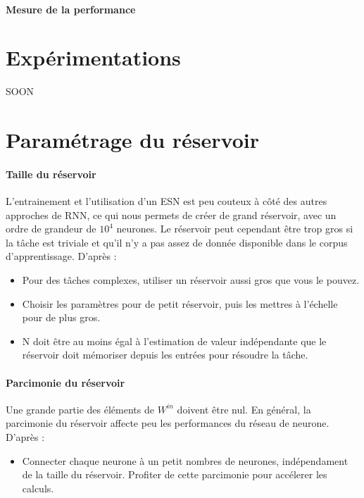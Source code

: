 \documentclass[12pt]{article}
\begin{document}
\paragraph{Mesure de la performance}

\section{Expérimentations}

\begin{center}
SOON
\end{center}


\appendix

\section{Paramétrage du réservoir}

\paragraph{Taille du réservoir}
L'entrainement et l'utilisation d'un ESN est peu couteux à côté des autres approches de RNN, ce qui nous permets de créer de grand réservoir, avec un ordre de grandeur de $10^{4}$ neurones. Le réservoir peut cependant être trop gros si la tâche est triviale et qu'il n'y a pas assez de donnée disponible dans le corpus d'apprentissage.\newline
D'après \cite{Lukosevicius12}:
\begin{itemize}
\item Pour des tâches complexes, utiliser un réservoir aussi gros que vous le pouvez.
\item Choisir les paramètres pour de petit réservoir, puis les mettres à l'échelle pour de plus gros.
\item N doit être au moins égal à l'estimation de valeur indépendante que le réservoir doit mémoriser depuis les entrées pour résoudre la tâche.
\end{itemize}

\paragraph{Parcimonie du réservoir}
Une grande partie des éléments de $W^{in}$ doivent être nul. En général, la parcimonie du réservoir affecte peu les performances du réseau de neurone.\newline
D'après \cite{Lukosevicius12}:
\begin{itemize}
\item Connecter chaque neurone à un petit nombres de neurones, indépendament de la taille du réservoir. Profiter de cette parcimonie pour accélerer les calculs.
\end{itemize}
\end{document}
